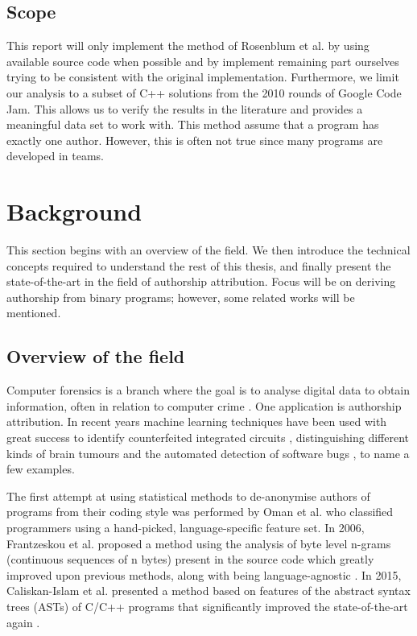 \documentclass[a4paper,11pt]{kth-mag}
\begin{document}
\section{Scope}
This report will only implement the method of Rosenblum et al. by using
available source code when possible and by implement remaining part ourselves
trying to be consistent with the original implementation.  Furthermore, we
limit our analysis to a subset of C++ solutions from the 2010 rounds of Google
Code Jam. This allows us to verify the results in the literature
\parencite{rosenblum2011wrote} and provides a meaningful data set to work with.
This method assume that a program has exactly one author. However, this is
often not true since many programs are developed in teams.

\chapter{Background}
This section begins with an overview of the field. We then introduce the
technical concepts required to understand the rest of this thesis, and finally
present the state-of-the-art in the field of authorship attribution. Focus will
be on deriving authorship from binary programs; however, some related works
will be mentioned.

\section{Overview of the field}
Computer forensics is a branch where the goal is to analyse digital data to
obtain information, often in relation to computer crime
\parencite{reith2002examination}. One application is authorship attribution. In
recent years machine learning techniques have been used with great success to
identify counterfeited integrated circuits \parencite{huang2013counterfeit},
distinguishing different kinds of brain tumours
\parencite{zacharaki2009classification} and the automated detection of software
bugs \parencite{aleem2015comparative}, to name a few examples.

The first attempt at using statistical methods to de-anonymise authors of
programs from their coding style was performed by Oman et al.
\parencite{oman1989programming} who classified programmers using a hand-picked,
language-specific feature set. In 2006, Frantzeskou et al. proposed a method
using the analysis of byte level n-grams (continuous sequences of n bytes)
present in the source code which greatly improved upon previous methods, along
with being language-agnostic \parencite{frantzeskou2006source}. In 2015,
Caliskan-Islam et al. presented a method based on features of the abstract
syntax trees (ASTs) of C/C++ programs that significantly improved the
state-of-the-art again \parencite{caliskan2015anonymizing}.
 
\end{document}
